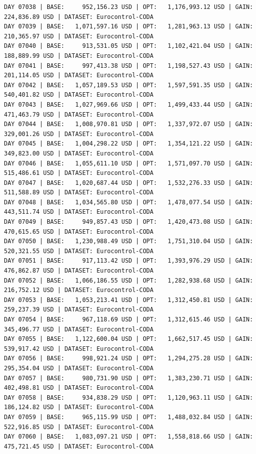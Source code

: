 \documentclass[11pt,a4paper]{article}
\begin{document}
\begin{verbatim}
DAY 07038 | BASE:     952,156.23 USD | OPT:   1,176,993.12 USD | GAIN: 224,836.89 USD | DATASET: Eurocontrol-CODA
DAY 07039 | BASE:   1,071,597.16 USD | OPT:   1,281,963.13 USD | GAIN: 210,365.97 USD | DATASET: Eurocontrol-CODA
DAY 07040 | BASE:     913,531.05 USD | OPT:   1,102,421.04 USD | GAIN: 188,889.99 USD | DATASET: Eurocontrol-CODA
DAY 07041 | BASE:     997,413.38 USD | OPT:   1,198,527.43 USD | GAIN: 201,114.05 USD | DATASET: Eurocontrol-CODA
DAY 07042 | BASE:   1,057,189.53 USD | OPT:   1,597,591.35 USD | GAIN: 540,401.82 USD | DATASET: Eurocontrol-CODA
DAY 07043 | BASE:   1,027,969.66 USD | OPT:   1,499,433.44 USD | GAIN: 471,463.79 USD | DATASET: Eurocontrol-CODA
DAY 07044 | BASE:   1,008,970.81 USD | OPT:   1,337,972.07 USD | GAIN: 329,001.26 USD | DATASET: Eurocontrol-CODA
DAY 07045 | BASE:   1,004,298.22 USD | OPT:   1,354,121.22 USD | GAIN: 349,823.00 USD | DATASET: Eurocontrol-CODA
DAY 07046 | BASE:   1,055,611.10 USD | OPT:   1,571,097.70 USD | GAIN: 515,486.61 USD | DATASET: Eurocontrol-CODA
DAY 07047 | BASE:   1,020,687.44 USD | OPT:   1,532,276.33 USD | GAIN: 511,588.89 USD | DATASET: Eurocontrol-CODA
DAY 07048 | BASE:   1,034,565.80 USD | OPT:   1,478,077.54 USD | GAIN: 443,511.74 USD | DATASET: Eurocontrol-CODA
DAY 07049 | BASE:     949,857.43 USD | OPT:   1,420,473.08 USD | GAIN: 470,615.65 USD | DATASET: Eurocontrol-CODA
DAY 07050 | BASE:   1,230,988.49 USD | OPT:   1,751,310.04 USD | GAIN: 520,321.55 USD | DATASET: Eurocontrol-CODA
DAY 07051 | BASE:     917,113.42 USD | OPT:   1,393,976.29 USD | GAIN: 476,862.87 USD | DATASET: Eurocontrol-CODA
DAY 07052 | BASE:   1,066,186.55 USD | OPT:   1,282,938.68 USD | GAIN: 216,752.12 USD | DATASET: Eurocontrol-CODA
DAY 07053 | BASE:   1,053,213.41 USD | OPT:   1,312,450.81 USD | GAIN: 259,237.39 USD | DATASET: Eurocontrol-CODA
DAY 07054 | BASE:     967,118.69 USD | OPT:   1,312,615.46 USD | GAIN: 345,496.77 USD | DATASET: Eurocontrol-CODA
DAY 07055 | BASE:   1,122,600.04 USD | OPT:   1,662,517.45 USD | GAIN: 539,917.42 USD | DATASET: Eurocontrol-CODA
DAY 07056 | BASE:     998,921.24 USD | OPT:   1,294,275.28 USD | GAIN: 295,354.04 USD | DATASET: Eurocontrol-CODA
DAY 07057 | BASE:     980,731.90 USD | OPT:   1,383,230.71 USD | GAIN: 402,498.81 USD | DATASET: Eurocontrol-CODA
DAY 07058 | BASE:     934,838.29 USD | OPT:   1,120,963.11 USD | GAIN: 186,124.82 USD | DATASET: Eurocontrol-CODA
DAY 07059 | BASE:     965,115.99 USD | OPT:   1,488,032.84 USD | GAIN: 522,916.85 USD | DATASET: Eurocontrol-CODA
DAY 07060 | BASE:   1,083,097.21 USD | OPT:   1,558,818.66 USD | GAIN: 475,721.45 USD | DATASET: Eurocontrol-CODA

\end{verbatim}
\end{document}
